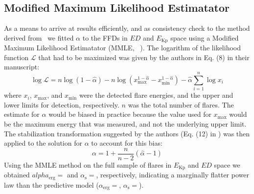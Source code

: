 \documentclass{aa}
\begin{document}
\begin{appendix}
\section{Modified Maximum Likelihood Estimatator}
\label{sec:app:MMLE}
As a means to arrive at results efficiently, and as consistency check to the method derived from~\citet{wheatland_flaresbayes_2004} we fitted $\alpha$ to the FFDs in $ED$ and $E_\mathrm{Kp}$ space using a Modified Maximum Likelihood Estimatator (MMLE,~ \citealt{maschberger_powerlaw_2009}). The logarithm of the likelihood function $\mathcal{L}$ that had to be maximized was given by the authors in Eq. (8) in their manuscript:
\begin{equation}
\log \mathcal{L} = n \log (1-\hat{\alpha})-n \log\left(x_\mathrm{max}^{1-\hat{\alpha}}-x_\mathrm{min}^{1-\hat{\alpha}}\right) - \hat{\alpha} \displaystyle\sum_{i=1}^{n}\log x_i
\label{eqn:MLE}
\end{equation}
where $x_i$, $x_\mathrm{max}$, and $x_\mathrm{min}$ were the detected flare energies, and the upper and lower limits for detection, respectively. $n$ was the total number of flares. The estimate for $\alpha$ would be biased in practice because the value used for $x_\mathrm{max}$ would be the maximum energy that was measured, and not the underlying upper limit. The stabilization transformation suggested by the authors (Eq. (12) in \citealt{maschberger_powerlaw_2009}) was then applied to the solution for $\alpha$ to account for this bias:
\begin{equation}
\alpha = 1 + \dfrac{n}{n-2}(\hat{\alpha} - 1)
\label{eqn:MLE_stabilize}
\end{equation}
Using the MMLE method on the full sample of flares in $E_\mathrm{Kp}$ and $ED$ space we obtained $alpha_\mathrm{erg}=$ and $\alpha_\mathrm{s}=$, respectively, indicating a marginally flatter power law than the predictive model ($\alpha_\mathrm{erg}=$, $\alpha_\mathrm{s}=$).

\end{appendix}
\end{document}
